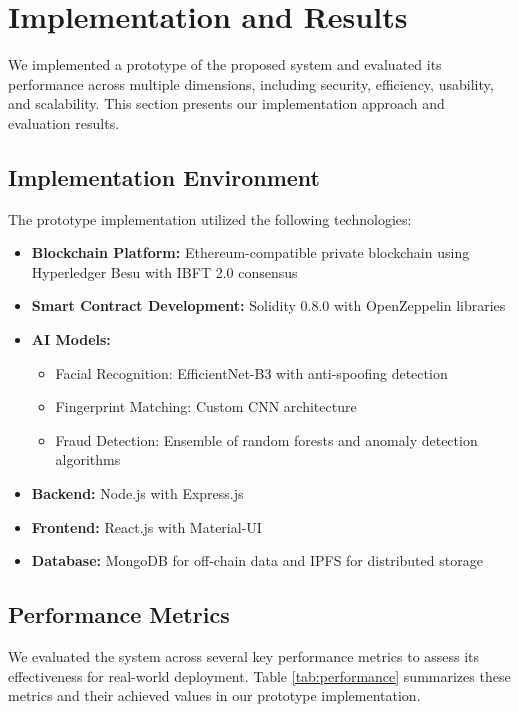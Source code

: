\documentclass[conference]{IEEEtran}
\begin{document}
\section{Implementation and Results}
We implemented a prototype of the proposed system and evaluated its performance across multiple dimensions, including security, efficiency, usability, and scalability. This section presents our implementation approach and evaluation results.

\subsection{Implementation Environment}
The prototype implementation utilized the following technologies:

\begin{itemize}
    \item \textbf{Blockchain Platform:} Ethereum-compatible private blockchain using Hyperledger Besu with IBFT 2.0 consensus
    \item \textbf{Smart Contract Development:} Solidity 0.8.0 with OpenZeppelin libraries
    \item \textbf{AI Models:} 
    \begin{itemize}
        \item Facial Recognition: EfficientNet-B3 with anti-spoofing detection
        \item Fingerprint Matching: Custom CNN architecture
        \item Fraud Detection: Ensemble of random forests and anomaly detection algorithms
    \end{itemize}
    \item \textbf{Backend:} Node.js with Express.js
    \item \textbf{Frontend:} React.js with Material-UI
    \item \textbf{Database:} MongoDB for off-chain data and IPFS for distributed storage
\end{itemize}

\subsection{Performance Metrics}
We evaluated the system across several key performance metrics to assess its effectiveness for real-world deployment. Table \ref{tab:performance} summarizes these metrics and their achieved values in our prototype implementation.
\end{document}
